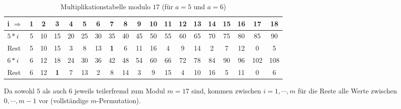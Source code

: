 \begin{refsegment}
\begin{table}[ht]
\begin{center}
\begin{tabular}{|l@{\:}||c|c|c|c|c|c|c|c|c|c|c|c|c|c|c|c||c|c|}
\hline
i $\Rightarrow$     & 1  & 2  & 3  & 4  & 5  & 6  & 7  & 8  & 9 & 10 & 11 & 12 & 13 & 14 & 15 & 16  & 17 & 18\\
\hline
\hline
$5*i$               & 5 & 10 & 15 & 20 & 25 & 30 & 35 & 40 & 45 & 50 & 55 & 60 & 65 & 70 & 75 & 80  & 85 & 90\\
Rest                & 5 & 10 & 15  & 3  & 8 & 13  & {\bf 1}  & 6 & 11 & 16  & 4  & 9 & 14  & 2  & 7 & 12   & 0  & 5\\
\hline
$6*i$               & 6 & 12 & 18 & 24 & 30 & 36 & 42 & 48 & 54 & 60 & 66 & 72 & 78 & 84 & 90 & 96 & 102 & 108\\
Rest                & 6 & 12  & {\bf 1}  & 7 & 13  & 2  & 8 & 14  & 3  & 9 & 15  & 4 & 10 & 16  & 5 & 11   & 0  & 6\\
\hline
\end{tabular}
\end{center}
\caption{Multiplikationstabelle modulo $17$ (für $a=5$ und $a=6$)}
\label{SrcArith1a} \label{mulmod17}
\end{table}

Da sowohl $5$ als auch $6$ jeweils teilerfremd  zum Modul
$m=17$ sind, kommen zwischen $i=1, \cdots, m$ für die Reste alle Werte zwischen
$0, \cdots, m-1$ vor (vollständige $m$-Permutation).






\end{refsegment}
